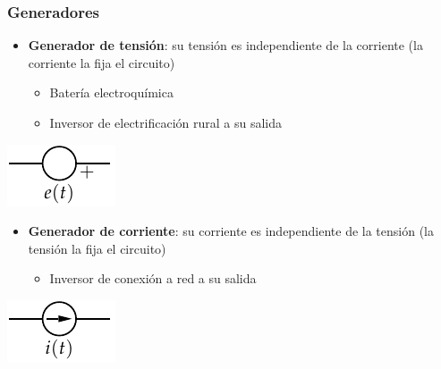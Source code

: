 \documentclass[serif, xcolor=dvipsnames]{beamer}
\begin{document}
\begin{frame}
  \frametitle{Generadores}
  \begin{itemize}
  \item \textbf{Generador de tensión}: su tensión es independiente de
    la corriente (la corriente la fija el circuito)

    \begin{itemize}
    \item Batería electroquímica
    \item Inversor de electrificación rural a su salida
    \end{itemize}
  \end{itemize}
  \begin{center}
    \includegraphics{../figs/GeneradorTension}
    \par\end{center}
  \begin{itemize}
  \item \textbf{Generador de corriente}: su corriente es independiente
    de la tensión (la tensión la fija el circuito)

    \begin{itemize}
    \item Inversor de conexión a red a su salida
    \end{itemize}
  \end{itemize}
  \begin{center}
    \includegraphics{../figs/GeneradorCorriente}
    \par\end{center}


\end{frame}
\end{document}
